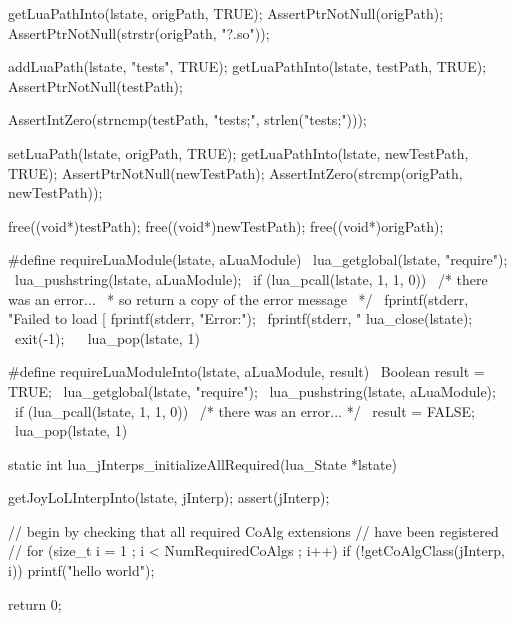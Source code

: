 
\startCTest
  getLuaPathInto(lstate, origPath, TRUE);
  AssertPtrNotNull(origPath);
  AssertPtrNotNull(strstr(origPath, "?.so"));

  addLuaPath(lstate, "tests", TRUE);
  getLuaPathInto(lstate, testPath, TRUE);
  AssertPtrNotNull(testPath);

  AssertIntZero(strncmp(testPath, "tests;", strlen("tests;")));
  
  setLuaPath(lstate, origPath, TRUE);
  getLuaPathInto(lstate, newTestPath, TRUE);
  AssertPtrNotNull(newTestPath);
  AssertIntZero(strcmp(origPath, newTestPath));
  
  free((void*)testPath);
  free((void*)newTestPath);
  free((void*)origPath);
\stopCTest
\stopTestCase
\stopTestSuite


\startCHeader
#define requireLuaModule(lstate, aLuaModule)              \
  lua_getglobal(lstate, "require");                       \
  lua_pushstring(lstate, aLuaModule);                     \
  if (lua_pcall(lstate, 1, 1, 0)) {                       \
    /* there was an error...                              \
     * so return a copy of the error message              \
     */                                                   \
    fprintf(stderr, "Failed to load [%
    fprintf(stderr, "Error:\n");                          \
    fprintf(stderr, "%
    lua_close(lstate);                                    \
    exit(-1);                                             \
  }                                                       \
  lua_pop(lstate, 1)
\stopCHeader

\startCHeader
#define requireLuaModuleInto(lstate, aLuaModule, result)  \
  Boolean result = TRUE;                                  \
  lua_getglobal(lstate, "require");                       \
  lua_pushstring(lstate, aLuaModule);                     \
  if (lua_pcall(lstate, 1, 1, 0)) {                       \
    /* there was an error... */                           \
    result = FALSE;                                       \
  }                                                       \
  lua_pop(lstate, 1)
\stopCHeader

\stopTestSuite

\startCCode
static int lua_jInterps_initializeAllRequired(lua_State *lstate) {
  getJoyLoLInterpInto(lstate, jInterp);
  assert(jInterp);
  
  // begin by checking that all required CoAlg extensions 
  // have been registered
  //
  for (size_t i = 1 ; i < NumRequiredCoAlgs ; i++) {
    if (!getCoAlgClass(jInterp, i)) {
      printf("hello world\n");
    }
  }
  
  return 0;
}
\stopCCode

